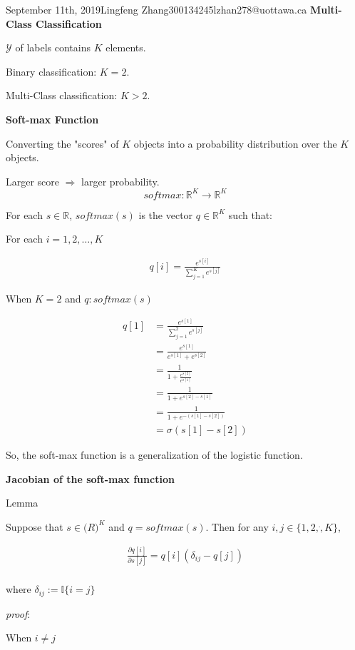 \documentclass{article}
\begin{document}
\begin{lecture}{September 11th, 2019}{Lingfeng Zhang}{300134245}{lzhan278@uottawa.ca}
\textbf{Multi-Class Classification}

$\mathcal{Y}$ of labels contains $K$ elements.

Binary classification: $K=2$. 

Multi-Class classification: $K>2$. 
        
\textbf{Soft-max Function}

Converting the "scores" of $K$ objects into a probability distribution over the $K$ objects.

Larger score $\Rightarrow$ larger probability. 
            \[
                softmax: \mathbb{R}^K \rightarrow \mathbb{R}^K
            \]
            
For each $s \in \mathbb{R}$, $softmax(s)$ is the vector $q \in \mathbb{R}^K$ such that:

For each $i=1,2,\dots,K$

\begin{eqnarray}
q[i] = \frac{e^{s[i]}}{\sum_{j=1}^K e^{s[j]}}
\end{eqnarray}

When $K=2$  and $q:softmax(s)$

\begin{align*}
q[1] &=  \frac{e^{s[1]}}{\sum_{j=1}^2 e^{s[j]}} \\ 
&=  \frac{e^{s[1]}}{ e^{s[1]} + e^{s[2]}} \\ 
&= \frac{1}{1+\frac{e^{s[2]}}{e^{s[1]}}} \\
&= \frac{1}{1+e^{s[2]-s[1]}} \\
&= \frac{1}{1+e^{-(s[1]-s[2])}} \\
&= \sigma(s[1]-s[2])
\end{align*}

So, the soft-max function is a generalization of the logistic function.

\textbf{Jacobian of the soft-max function}

\noindent Lemma

Suppose that $s \in \mathcal(R)^K$ and $q=softmax(s)$. Then for any $i,j \in \{ 1,2, \dot, K \} $,

\begin{eqnarray*}
\frac{\partial q[i]}{\partial s[j]} = q[i](\delta_{ij} - q[j]) \\
\end{eqnarray*}

where $\delta_{ij} := \mathbb{I}\{i=j\}$

\noindent \textit{proof}:

When $i \neq j$


\end{lecture}
\end{document}
